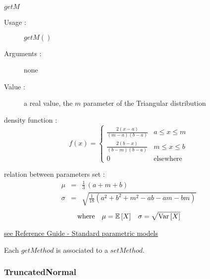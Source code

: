 \begin{description}
\begin{description}
  \item $getM$
    \begin{description}
    \item[Usage :] $getM()$
    \item[Arguments :] none
    \item[Value :]  a real value,  the $m$ parameter of the Triangular distribution
    \end{description}
    \bigskip
  \end{description}

\item[Details :]  \rule{0pt}{1em}
  \begin{description}
  \item density function :
    $$
    f(x) =
    \left\{
      \begin{array}{ll}
        \displaystyle \frac{2(x-a)}{(m-a)(b-a)} & a \leq x \leq m \\
        \displaystyle \frac{2(b-x)}{(b-m)(b-a)} & m \leq x \leq b \\
        0 & \mbox{elsewhere}
      \end{array}
    \right.
    $$

  \item relation between parameters set :
    \begin{eqnarray*}
      \mu                                       &       =       &   \frac{1}{3}\,(a+m+b)        \\
      \sigma                            &  =    &       \sqrt{ \frac{1}{18} (a^2+b^2+m^2-ab-am-bm)}
    \end{eqnarray*}
    \begin{align*}
      \mbox{where}
      &&
      \mu = {\mathbb E}\left[ X \right]
      &&
      \sigma = \sqrt{{\rm Var}\left[ X \right] }
    \end{align*}
  \end{description}
  \bigskip

\item[Links :]  \rule{0pt}{1em}
  \href{OpenTURNS_ReferenceGuide.pdf}{see Reference Guide - Standard parametric models}
\end{description}


Each  $getMethod$  is associated to a $setMethod$.

\newpage \subsubsection{TruncatedNormal}

